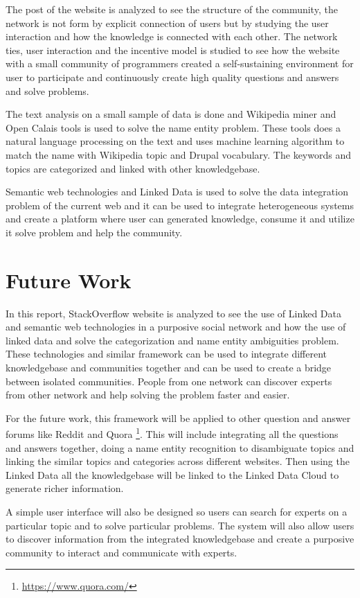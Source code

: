 The post of the website is analyzed to see the structure of the community, the network is not form by explicit connection of users but by studying the user interaction and how the knowledge is connected with each other. The network ties, user interaction and the incentive model is studied to see how the website with a small community of programmers created a self-sustaining environment for user to participate and continuously create high quality questions and answers and solve problems.

The text analysis on a small sample of data is done and Wikipedia miner and Open Calais tools is used to solve the name entity problem. These tools does a natural language processing on the text and uses machine learning algorithm to match the name with Wikipedia topic and Drupal vocabulary. The keywords and topics are categorized and linked with other knowledgebase.

Semantic web technologies and Linked Data is used to solve the data integration problem of the current web and it can be used to integrate heterogeneous systems and create a platform where user can generated knowledge, consume it and utilize it solve problem and help the community.

\section{Future Work}

In this report, StackOverflow website is analyzed to see the use of Linked Data and semantic web technologies in a purposive social network and how the use of linked data and solve the categorization and name entity ambiguities problem. These technologies and similar framework can be used to integrate different knowledgebase and communities together and can be used to create a bridge between isolated communities. People from one network can discover experts from other network and help solving the problem faster and easier.

For the future work, this framework will be applied to other question and answer forums like Reddit and Quora \footnote{\url{https://www.quora.com/}}. This will include integrating all the questions and answers together, doing a name entity recognition to disambiguate topics and linking the similar topics and categories across different websites. Then using the Linked Data all the knowledgebase will be linked to the Linked Data Cloud to generate richer information.

A simple user interface will also be designed so users can search for  experts on a particular topic and to solve particular problems. The system will also allow users to discover information from the integrated knowledgebase and create a purposive community to interact and communicate with experts.

